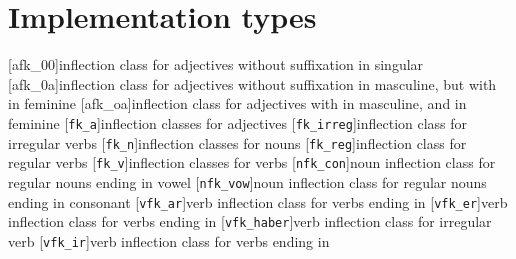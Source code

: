 \chapter{Implementation types}


\begin{multicols}{2}
\setlength{\columnseprule}{.5pt}
\begin{acronym}[VFKhaber]
	[afk\_00]{inflection class for adjectives without suffixation in singular}
	[afk\_0a]{inflection class for adjectives without suffixation in masculine, but with  in feminine}
	[afk\_oa]{inflection class for adjectives with  in masculine, and  in feminine}
%
	[\texttt{fk\_a}]{inflection classes for adjectives}	
	[\texttt{fk\_irreg}]{inflection class for irregular verbs}
	[\texttt{fk\_n}]{inflection classes for nouns}
	[\texttt{fk\_reg}]{inflection class for regular verbs}
	[\texttt{fk\_v}]{inflection classes for verbs}
%
	[\texttt{nfk\_con}]{noun inflection class for regular nouns ending in vowel}
	[\texttt{nfk\_vow}]{noun inflection class for regular nouns ending in consonant}	
%
	[\texttt{vfk\_ar}]{verb inflection class for verbs ending in }
	[\texttt{vfk\_er}]{verb inflection class for verbs ending in }
	[\texttt{vfk\_haber}]{verb inflection class for irregular verb }	
	[\texttt{vfk\_ir}]{verb inflection class for verbs ending in }		
%
%	
\end{acronym}
\end{multicols}